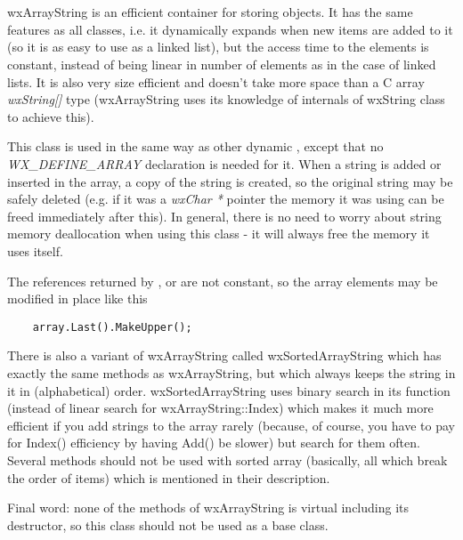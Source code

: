 \section{}\label{wxarraystring}

wxArrayString is an efficient container for storing 
 objects. It has the same features as all 
 classes, i.e. it dynamically expands when new items
are added to it (so it is as easy to use as a linked list), but the access
time to the elements is constant, instead of being linear in number of
elements as in the case of linked lists. It is also very size efficient and
doesn't take more space than a C array {\it wxString[]} type (wxArrayString
uses its knowledge of internals of wxString class to achieve this).

This class is used in the same way as other dynamic ,
except that no {\it WX\_DEFINE\_ARRAY} declaration is needed for it. When a
string is added or inserted in the array, a copy of the string is created, so
the original string may be safely deleted (e.g. if it was a {\it wxChar *} 
pointer the memory it was using can be freed immediately after this). In
general, there is no need to worry about string memory deallocation when using
this class - it will always free the memory it uses itself.

The references returned by , 
 or 
 are not constant, so the
array elements may be modified in place like this

\begin{verbatim}
    array.Last().MakeUpper();
\end{verbatim}

There is also a variant of wxArrayString called wxSortedArrayString which has
exactly the same methods as wxArrayString, but which always keeps the string
in it in (alphabetical) order. wxSortedArrayString uses binary search in its 
 function (instead of linear search for
wxArrayString::Index) which makes it much more efficient if you add strings to
the array rarely (because, of course, you have to pay for Index() efficiency
by having Add() be slower) but search for them often. Several methods should
not be used with sorted array (basically, all which break the order of items)
which is mentioned in their description.

Final word: none of the methods of wxArrayString is virtual including its
destructor, so this class should not be used as a base class.

